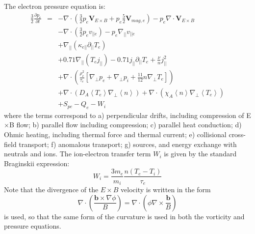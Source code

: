 \documentclass[12pt,a4paper]{article}
\newcommand{\deriv}[2]{\frac{\partial #1}{\partial #2}}
\begin{document}
The electron pressure equation is:
\begin{subequations}
\begin{eqnarray}
  \frac{3}{2}\deriv{p_e}{t} &=& -\nabla\cdot\left(\frac{3}{2}p_e\mathbf{V}_{E\times B} + p_e\frac{5}{2}\mathbf{V}_{mag,e}\right) - p_e\nabla\cdot\mathbf{V}_{E\times B}\\
  &&  - \nabla\cdot\left(\frac{3}{2}p_e v_{||e}\right) - p_e\nabla_{||}v_{||e} \\
  && + \nabla_{||}\left(\kappa_{e||}\partial_{||}T_e\right)  \\
  && + 0.71\nabla_{||}\left(T_e j_{||}\right) - 0.71 j_{||}\partial_{||} T_e + \frac{\nu}{n}j_{||}^2 \\
  && + \nabla\cdot\left(\frac{\rho_e^2}{\tau_e}\left[\nabla_\perp p_e + \nabla_\perp p_i + \frac{11}{12}n\nabla_\perp T_e\right]\right) \\
  && + \nabla\cdot \left(D_A\left<T_e\right>\nabla_\perp \left<n\right>\right) + \nabla\cdot\left(\chi_A \left<n\right>\nabla_\perp \left<T_e\right>\right) \\
  && + S_{pe} - Q_e - W_i
\end{eqnarray}
\end{subequations}
where the terms correspond to a) perpendicular drifts, including compression of E$\times$B flow; b) parallel flow including compression; c) parallel heat conduction; d) Ohmic heating, including thermal force and thermal current; e) collisional cross-field transport; f) anomalous transport; g) sources, and energy exchange with neutrals and ions.
The ion-electron transfer term $W_i$ is given by the standard Braginskii expression:
\begin{equation}
  W_i = \frac{3m_e}{m_i}\frac{n\left(T_e - T_i\right)}{\tau_e}
\end{equation}
Note that the divergence of the $E\times B$ velocity is written in the form
\[
\nabla\cdot\left(\frac{\mathbf{b}\times\nabla\phi}{B}\right) = \nabla\cdot\left( \phi \nabla\times\frac{\mathbf{b}}{B}\right)
\]
is used, so that the same form of the curvature is used in both the vorticity and pressure equations.
\end{document}
